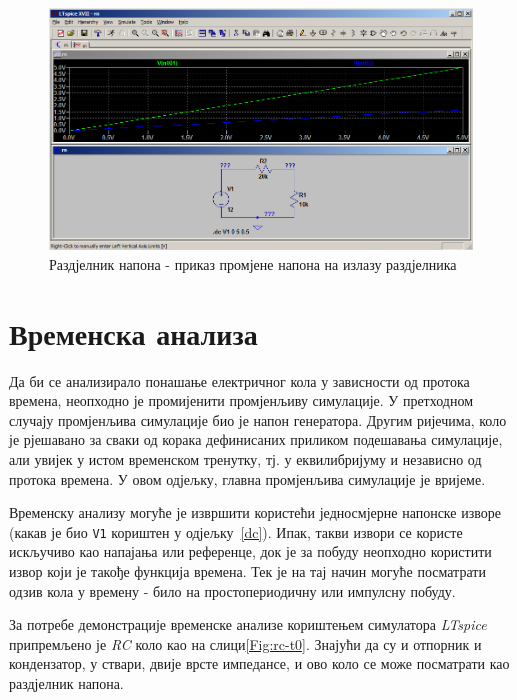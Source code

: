 \begin{figure}[h]
\centering
\includegraphics[width=\figwidth\textwidth]{figs/rn-dc5.PNG}
\caption{Раздјелник напона - приказ промјене напона на излазу раздјелника}
\label{Fig:rn-dc5}
\end{figure}

\section{Временска анализа}
\label{tran}

Да би се анализирало понашање електричног кола у зависности од протока времена, неопходно је промијенити промјенљиву симулације. У претходном случају промјенљива симулације био је напон генератора. Другим ријечима, коло је рјешавано за сваки од корака дефинисаних приликом подешавања симулације, али увијек у истом временском тренутку, тј. у еквилибријуму и независно од протока времена. У овом одјељку, главна промјенљива симулације је вријеме.

Временску анализу могуће је извршити користећи једносмјерне напонске изворе (какав је био \texttt{V1} кориштен у одјељку~\ref{dc}). Ипак, такви извори се користе искључиво као напајања или референце, док је за побуду неопходно користити извор који је такође функција времена. Тек је на тај начин могуће посматрати одзив кола у времену - било на простопериодичну или импулсну побуду.

За потребе демонстрације временске анализе кориштењем симулатора \textit{LTspice} припремљено је \textit{RC} коло као на слици\ref{Fig:rc-t0}. Знајући да су и отпорник и кондензатор, у ствари, двије врсте импедансе, и ово коло се може посматрати као раздјелник напона.

